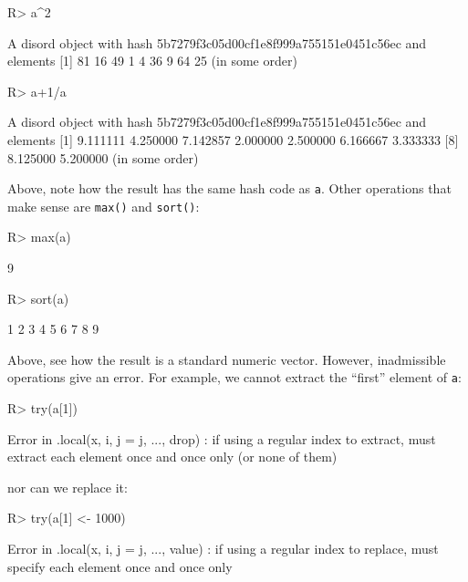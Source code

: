 \documentclass{article}
\begin{document}
\begin{Schunk}
\begin{Sinput}
R> a^2
\end{Sinput}
\begin{Soutput}
A disord object with hash 5b7279f3c05d00cf1e8f999a755151e0451c56ec and elements
[1] 81 16 49  1  4 36  9 64 25
(in some order)
\end{Soutput}
\begin{Sinput}
R> a+1/a
\end{Sinput}
\begin{Soutput}
A disord object with hash 5b7279f3c05d00cf1e8f999a755151e0451c56ec and elements
[1] 9.111111 4.250000 7.142857 2.000000 2.500000 6.166667 3.333333
[8] 8.125000 5.200000
(in some order)
\end{Soutput}
\end{Schunk}

Above, note how the result has the same hash code as {\tt a}.  Other
operations that make sense are {\tt max()} and {\tt sort()}:

\begin{Schunk}
\begin{Sinput}
R> max(a)
\end{Sinput}
\begin{Soutput}
[1] 9
\end{Soutput}
\begin{Sinput}
R> sort(a)
\end{Sinput}
\begin{Soutput}
[1] 1 2 3 4 5 6 7 8 9
\end{Soutput}
\end{Schunk}

Above, see how the result is a standard numeric vector.  However,
inadmissible operations give an error.  For example, we cannot extract
the ``first'' element of {\tt a}:



\begin{Schunk}
\begin{Sinput}
R> try(a[1])
\end{Sinput}
\begin{Soutput}
Error in .local(x, i, j = j, ..., drop) : 
  if using a regular index to extract, must extract each element once and once only (or none of them)
\end{Soutput}
\end{Schunk}

nor can we replace it:

\begin{Schunk}
\begin{Sinput}
R> try(a[1] <- 1000)
\end{Sinput}
\begin{Soutput}
Error in .local(x, i, j = j, ..., value) : 
  if using a regular index to replace, must specify each element once and once only
\end{Soutput}
\end{Schunk}
\end{document}
